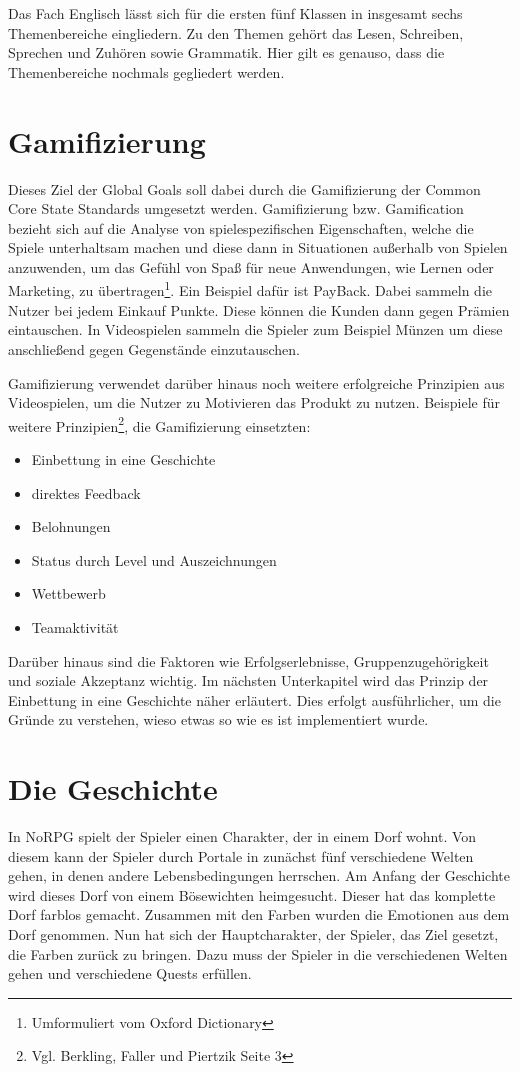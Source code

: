 Das Fach Englisch lässt sich für die ersten fünf Klassen in insgesamt sechs Themenbereiche eingliedern. Zu den Themen gehört das Lesen, Schreiben, Sprechen und Zuhören sowie Grammatik. Hier gilt es genauso, dass die Themenbereiche nochmals gegliedert werden.

\section{Gamifizierung}
Dieses Ziel der Global Goals soll dabei durch die Gamifizierung der Common Core State Standards umgesetzt werden. Gamifizierung bzw. Gamification bezieht sich auf die Analyse von spielespezifischen Eigenschaften, welche die Spiele unterhaltsam machen und diese dann in Situationen außerhalb von Spielen anzuwenden, um das Gefühl von Spaß für neue Anwendungen, wie Lernen oder Marketing, zu übertragen\footnote{Umformuliert vom Oxford Dictionary}. Ein Beispiel dafür ist PayBack. Dabei sammeln die Nutzer bei jedem Einkauf Punkte. Diese können die Kunden dann gegen Prämien eintauschen. In Videospielen sammeln die Spieler zum Beispiel Münzen um diese anschließend gegen Gegenstände einzutauschen. 

Gamifizierung verwendet darüber hinaus noch weitere erfolgreiche Prinzipien aus Videospielen, um die Nutzer zu Motivieren das Produkt zu nutzen. Beispiele für weitere Prinzipien\footnote{Vgl. Berkling, Faller und Piertzik \cite{gamesPaper} Seite 3}, die Gamifizierung einsetzten:

\begin{itemize}
\item Einbettung in eine Geschichte
\item direktes Feedback
\item Belohnungen
\item Status durch Level und Auszeichnungen
\item Wettbewerb
\item Teamaktivität
\end{itemize}

Darüber hinaus sind die Faktoren wie Erfolgserlebnisse, Gruppenzugehörigkeit und soziale Akzeptanz wichtig. Im nächsten Unterkapitel wird das Prinzip der Einbettung in eine Geschichte näher erläutert. Dies erfolgt ausführlicher, um die Gründe zu verstehen, wieso etwas so wie es ist implementiert wurde.
	
\section{Die Geschichte}
In NoRPG spielt der Spieler einen Charakter, der in einem Dorf wohnt. Von diesem kann der Spieler durch Portale in zunächst fünf verschiedene Welten gehen, in denen andere Lebensbedingungen herrschen. Am Anfang der Geschichte wird dieses Dorf von einem Bösewichten heimgesucht. Dieser hat das komplette Dorf farblos gemacht. Zusammen mit den Farben wurden die Emotionen aus dem Dorf genommen. Nun hat sich der Hauptcharakter, der Spieler, das Ziel gesetzt, die Farben zurück zu bringen. Dazu muss der Spieler in die verschiedenen Welten gehen und verschiedene Quests erfüllen.

